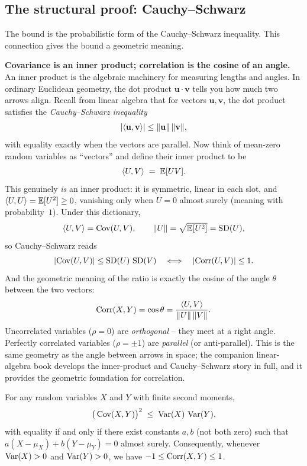 \subsection{The structural proof: Cauchy--Schwarz}

The bound is the probabilistic form of the Cauchy--Schwarz inequality. This connection gives the bound a geometric meaning.

\begin{connectionbox}
\textbf{Covariance is an inner product; correlation is the cosine of an angle.}
An inner product is the algebraic machinery for measuring lengths and angles. In ordinary Euclidean geometry, the dot product $\mathbf{u} \cdot \mathbf{v}$ tells you how much two arrows align. Recall from linear algebra that for vectors $\mathbf{u}, \mathbf{v}$, the dot product satisfies the \emph{Cauchy--Schwarz inequality}
\[
\lvert\langle \mathbf{u}, \mathbf{v}\rangle\rvert
\le \lVert\mathbf{u}\rVert\,\lVert\mathbf{v}\rVert,
\]
with equality exactly when the vectors are parallel. Now think of mean-zero random
variables as ``vectors'' and define their inner product to be
\[
\langle U, V \rangle \;=\; \operatorname{\mathbb{E}}[UV].
\]
This genuinely \emph{is} an inner product: it is symmetric, linear in each slot, and
$\langle U, U\rangle = \operatorname{\mathbb{E}}[U^2] \ge 0$, vanishing only when $U = 0$ almost surely (meaning with probability~$1$). Under this
dictionary,
\[
\langle U, V\rangle = \operatorname{Cov}(U, V), \qquad
\lVert U\rVert = \sqrt{\operatorname{\mathbb{E}}[U^2]} = \operatorname{SD}(U),
\]
so Cauchy--Schwarz reads
\[
\lvert\operatorname{Cov}(U, V)\rvert \le \operatorname{SD}(U)\,\operatorname{SD}(V)
\quad\Longleftrightarrow\quad
\lvert\operatorname{Corr}(U, V)\rvert \le 1.
\]
And the geometric meaning of the ratio is exactly the cosine of the angle $\theta$
between the two vectors:
\[
\operatorname{Corr}(X, Y) = \cos\theta = \frac{\langle U, V\rangle}{\lVert U\rVert\,\lVert V\rVert}.
\]
Uncorrelated variables ($\rho = 0$) are \emph{orthogonal} -- they meet at a right
angle. Perfectly correlated variables ($\rho = \pm 1$) are \emph{parallel} (or
anti-parallel). This is the same geometry as the angle between arrows in space; the
companion linear-algebra book develops the inner-product and Cauchy--Schwarz story
in full, and it provides the geometric foundation for correlation.
\end{connectionbox}

\begin{theorem}
\label{ch14:thm-cauchy-schwarz}
For any random variables $X$ and $Y$ with finite second moments,
\[
\big(\operatorname{Cov}(X, Y)\big)^2 \;\le\; \operatorname{Var}(X)\,\operatorname{Var}(Y),
\]
with equality if and only if there exist constants $a, b$ (not both zero) such that $a(X - \mu_X) + b(Y - \mu_Y) = 0$ almost surely. Consequently, whenever $\operatorname{Var}(X) > 0$ and $\operatorname{Var}(Y) > 0$, we have $-1 \le \operatorname{Corr}(X, Y) \le 1$.
\end{theorem}

